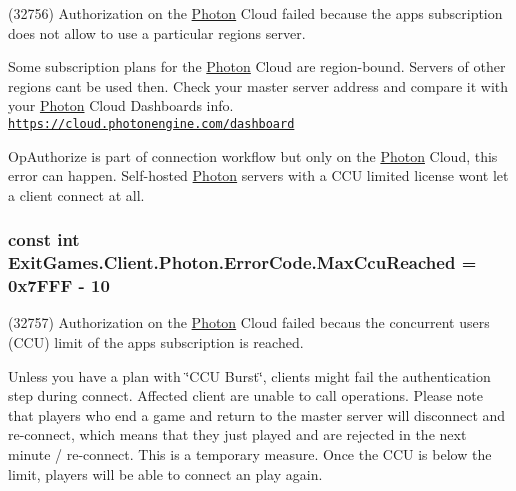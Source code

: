 (32756) Authorization on the \hyperlink{namespace_exit_games_1_1_client_1_1_photon}{Photon} Cloud failed because the app\textquotesingle{}s subscription does not allow to use a particular region\textquotesingle{}s server. 

Some subscription plans for the \hyperlink{namespace_exit_games_1_1_client_1_1_photon}{Photon} Cloud are region-\/bound. Servers of other regions can\textquotesingle{}t be used then. Check your master server address and compare it with your \hyperlink{namespace_exit_games_1_1_client_1_1_photon}{Photon} Cloud Dashboard\textquotesingle{}s info. \href{https://cloud.photonengine.com/dashboard}{\tt https\+://cloud.\+photonengine.\+com/dashboard}

Op\+Authorize is part of connection workflow but only on the \hyperlink{namespace_exit_games_1_1_client_1_1_photon}{Photon} Cloud, this error can happen. Self-\/hosted \hyperlink{namespace_exit_games_1_1_client_1_1_photon}{Photon} servers with a C\+CU limited license won\textquotesingle{}t let a client connect at all. 
\subsubsection[{\texorpdfstring{Max\+Ccu\+Reached}{MaxCcuReached}}]{\setlength{\rightskip}{0pt plus 5cm}const int Exit\+Games.\+Client.\+Photon.\+Error\+Code.\+Max\+Ccu\+Reached = 0x7\+F\+F\+F -\/ 10}\hypertarget{class_exit_games_1_1_client_1_1_photon_1_1_error_code_a7c5d773fe68373e9783828697d174d60}{}\label{class_exit_games_1_1_client_1_1_photon_1_1_error_code_a7c5d773fe68373e9783828697d174d60}


(32757) Authorization on the \hyperlink{namespace_exit_games_1_1_client_1_1_photon}{Photon} Cloud failed becaus the concurrent users (C\+CU) limit of the app\textquotesingle{}s subscription is reached. 

Unless you have a plan with \char`\"{}\+C\+C\+U Burst\char`\"{}, clients might fail the authentication step during connect. Affected client are unable to call operations. Please note that players who end a game and return to the master server will disconnect and re-\/connect, which means that they just played and are rejected in the next minute / re-\/connect. This is a temporary measure. Once the C\+CU is below the limit, players will be able to connect an play again.

